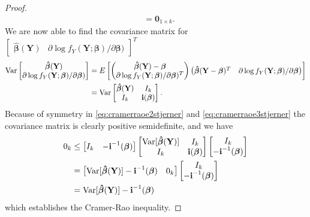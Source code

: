 \begin{proof}
\begin{align}
    &= \textbf{0}_{1 \times k} \label{eq:cramerraoe3stjerner}.
\end{align}
We are now able to find the covariance matrix for $\begin{bmatrix} \boldsymbol{\hat{\beta}}(\textbf{Y}) & \partial \log f_Y(\textbf{Y};\boldsymbol{\beta})/\partial \boldsymbol{\beta}) \end{bmatrix}^T$
\begin{align*}
    \operatorname{\text{Var}} \begin{bmatrix}  \boldsymbol{\hat{\beta}}(\textbf{Y}) \\  \partial \log f_Y(\textbf{Y};\boldsymbol{\beta})/\partial \boldsymbol{\beta}) \end{bmatrix} &= E \begin{bmatrix} \begin{pmatrix} \boldsymbol{\hat{\beta}}(\textbf{Y})-\boldsymbol{\beta} \\  \partial \log f_Y(\textbf{Y};\boldsymbol{\beta})/\partial \boldsymbol{\beta})^T\end{pmatrix} \begin{pmatrix} \boldsymbol{\hat{\beta}}(\textbf{Y}-\boldsymbol{\beta})^T &  \partial \log f_Y(\textbf{Y};\boldsymbol{\beta})/\partial \boldsymbol{\beta} \end{pmatrix}\end{bmatrix}  \\
    &= \operatorname{\text{Var}} \begin{bmatrix} \boldsymbol{\hat{\beta}}(\textbf{Y}) & I_{k}\\
    I_{k} & \textbf{i}(\boldsymbol{\beta})\end{bmatrix}.
\end{align*}
Because of symmetry in \eqref{eq:cramerraoe2stjerner} and \eqref{eq:cramerraoe3stjerner} the covariance matrix is clearly positive semidefinite, and we have
\begin{align*}
    0_{k} & \leq \begin{bmatrix} I_{k} & -\textbf{i}^{-1}(\boldsymbol{\beta})\end{bmatrix} \begin{bmatrix} \operatorname{\text{Var}}[\boldsymbol{\hat{\beta}}(\textbf{Y})] & I_{k} \\ I_{k} & \textbf{i}(\boldsymbol{\beta}) \end{bmatrix}\begin{bmatrix} I_{k} \\ -\textbf{i}^{-1}(\boldsymbol{\beta})\end{bmatrix} \\
    &= \begin{bmatrix} \operatorname{\text{Var}}[\boldsymbol{\hat{\beta}}(\textbf{Y})] -\textbf{i}^{-1}(\boldsymbol{\beta}) & 0_{k}\end{bmatrix} \begin{bmatrix} I_{k} \\ -\textbf{i}^{-1}(\boldsymbol{\beta})\end{bmatrix} \\
    &= \operatorname{\text{Var}}[\boldsymbol{\hat{\beta}}(\textbf{Y})] -\textbf{i}^{-1}(\boldsymbol{\beta})
\end{align*}
which establishes the Cramer-Rao inequality.
\end{proof}

